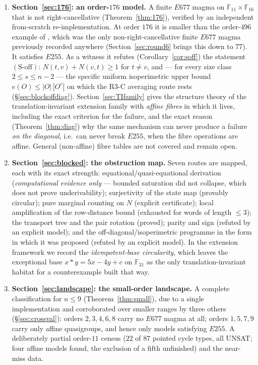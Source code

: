 \documentclass[11pt]{article}
\theoremstyle{plain}
\theoremstyle{definition}
\theoremstyle{remark}
\numberwithin{equation}{section}
\newcommand{\F}{\mathbb{F}}
\newcommand{\op}{\mathbin{*}}
\begin{document}
\begin{enumerate}
\item \textbf{Section~\ref{sec:176}: an order-$176$ model.} A finite $E677$ magma on
$\F_{11}\times\F_{16}$ that is not right-cancellative (Theorem~\ref{thm:176}), verified by an
independent from-scratch re-implementation. At order $176$ it is smaller than the order-$496$
example of \cite[\S13.1]{blueprint}, which was the only non-right-cancellative finite $E677$
magma previously recorded anywhere (Section~\ref{sec:round6} brings this down to $77$). It
satisfies $E255$. As a witness it refutes
(Corollary~\ref{cor:soff}) the statement $(\mathrm{S\text{-}off})$: $N(t,v)+N(v,t)\ge 1$ for
$t\ne v$, and --- for every size class $2\le s\le n-2$ --- the specific uniform isoperimetric
upper bound $e(O)\le |O|\,|O^{c}|$ on which the R3-C averaging route rests
(\S\ref{sec:blockoffdiag}). Section~\ref{sec:TIfamily} gives
the structure theory of the translation-invariant extension family with \emph{affine fibres}
in which it lives, including the exact criterion for the failure, and the exact reason
(Theorem~\ref{thm:diag}) why the same mechanism can never produce a failure \emph{on the
diagonal}, i.e.\ can never break $E255$, when the fibre operations are affine. General
(non-affine) fibre tables are not covered and remain open.

\item \textbf{Section~\ref{sec:blocked}: the obstruction map.} Seven routes are mapped, each
with its exact strength: equational/quasi-equational derivation
(\emph{computational evidence only} --- bounded saturation did not collapse, which does not
prove underivability); surjectivity of the state map (provably circular);
pure marginal counting on $N$ (explicit certificate); local amplification of the row-distance
bound (exhausted for words of length $\le 3$); the transport
tree and the pair rotation (proved); parity and sign (refuted by an explicit model); and the
off-diagonal/isoperimetric programme in the form in which it was proposed (refuted by an
explicit model). In the extension framework we record the \emph{idempotent-base circularity},
which leaves the exceptional base $x\op y = 5x-4y+c$ on $\F_{31}$ as the only
translation-invariant habitat for a counterexample built that way.

\item \textbf{Section~\ref{sec:landscape}: the small-order landscape.} A complete
classification for $n\le 9$ (Theorem~\ref{thm:small}), due to a single implementation and
corroborated over smaller ranges by three others (\S\ref{sec:crossval}):
orders $2,3,4,6,8$ carry no $E677$ magma at all; orders $1,5,7,9$ carry only
affine quasigroups, and hence only models satisfying $E255$. A deliberately partial order-$11$
census ($22$ of $87$ pointed cycle types, all UNSAT; four affine models found, the exclusion
of a fifth unfinished) and the near-miss data.


\end{enumerate}
\end{document}
